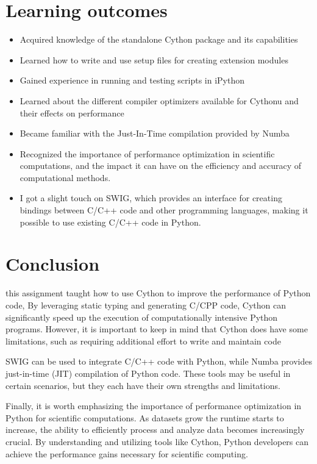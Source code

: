 \documentclass[titlepage, 11pt]{article}
\begin{document}
\section{Learning outcomes}
\begin{itemize}
    \item Acquired knowledge of the standalone Cython package and its capabilities
    \item Learned how to write and use setup files for creating extension modules
    \item Gained experience in running and testing scripts in iPython
    \item Learned about the different compiler optimizers available for Cythonu and their effects on performance
    \item Became familiar with the Just-In-Time compilation provided by Numba
    \item Recognized the importance of performance optimization in scientific computations, and the impact it can have on the efficiency and accuracy of computational methods.
    \item I got a slight touch on SWIG, which provides an interface for creating bindings between C/C++ code and other programming languages, making it possible to use existing C/C++ code in Python.


\end{itemize}
\section{Conclusion}
\begin{flushleft}
this assignment taught how to use Cython 
to improve the performance of Python code, By leveraging static typing
and generating C/CPP code, 
Cython can significantly speed up the execution of computationally intensive Python programs. However, it is important to keep in mind 
that Cython does have some limitations, such 
as requiring additional effort to write and maintain code
\end{flushleft}
\begin{flushleft}
    SWIG can be used to integrate C/C++ code with Python, while Numba provides just-in-time (JIT) compilation of Python code. These tools may be useful in certain scenarios, but they each have their own strengths and limitations.
\end{flushleft}
\begin{flushleft}
    Finally, it is worth emphasizing the importance of performance optimization in Python for scientific computations. As datasets grow the runtime starts to increase, the ability to efficiently process and analyze data becomes increasingly crucial. By understanding and utilizing tools like Cython, Python developers can achieve the performance gains necessary for scientific computing.
\end{flushleft}


% 
% 
\end{document}
